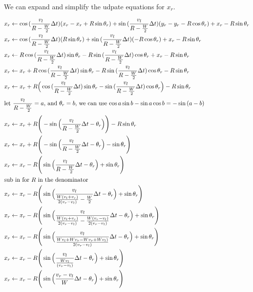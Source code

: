 \documentclass{article}
\begin{document}
We can expand and simplify the udpate equations for $x_r$.

\begin{align}
  x_r &\leftarrow \cos{(\dfrac{v_l}{R-\frac{W}{2}}\Delta t)}(x_r-x_r+R\sin{\theta_r})+\sin{(\dfrac{v_l}{R-\frac{W}{2}}\Delta t)}(y_r-y_r-R\cos{\theta_r}) + x_r-R\sin{\theta_r} \\
  x_r &\leftarrow \cos{(\dfrac{v_l}{R-\frac{W}{2}}\Delta t)}(R\sin{\theta_r})+\sin{(\dfrac{v_l}{R-\frac{W}{2}}\Delta t)}(-R\cos{\theta_r}) + x_r-R\sin{\theta_r} \\
  x_r &\leftarrow R\cos{(\dfrac{v_l}{R-\frac{W}{2}}\Delta t)}\sin{\theta_r}-R\sin{(\dfrac{v_l}{R-\frac{W}{2}}\Delta t)}\cos{\theta_r} + x_r-R\sin{\theta_r} \\
  x_r &\leftarrow x_r+R\cos{(\dfrac{v_l}{R-\frac{W}{2}}\Delta t)}\sin{\theta_r}-R\sin{(\dfrac{v_l}{R-\frac{W}{2}}\Delta t)}\cos{\theta_r}-R\sin{\theta_r} \\
  x_r &\leftarrow x_r+R\Big(\cos{(\dfrac{v_l}{R-\frac{W}{2}}\Delta t)}\sin{\theta_r}-\sin{(\dfrac{v_l}{R-\frac{W}{2}}\Delta t)}\cos{\theta_r}\Big)-R\sin{\theta_r} \\
  \shortintertext{let $\dfrac{v_l}{R-\frac{W}{2}}=a$, and $\theta_r=b$, we can use $\cos{a}\sin{b}-\sin{a}\cos{b}=-\sin{(a-b)}$}
  x_r &\leftarrow x_r+R\Bigg(-\sin{\Big(\dfrac{v_l}{R-\frac{W}{2}}\Delta t-\theta_r}\Big)\Bigg)-R\sin{\theta_r} \\
  x_r &\leftarrow x_r+R\Bigg(-\sin{\Big(\dfrac{v_l}{R-\frac{W}{2}}\Delta t-\theta_r}\Big)-\sin{\theta_r}\Bigg) \\
  x_r &\leftarrow x_r-R\Bigg(\sin{\Big(\dfrac{v_l}{R-\frac{W}{2}}\Delta t-\theta_r}\Big)+\sin{\theta_r}\Bigg) \\
  \shortintertext{sub in for $R$ in the denominator}
  x_r &\leftarrow x_r-R\Bigg(\sin{\Big(\dfrac{v_l}{\frac{W(v_l+v_r)}{2(v_r-v_l)}-\frac{W}{2}}\Delta t-\theta_r}\Big)+\sin{\theta_r}\Bigg) \\
  x_r &\leftarrow x_r-R\Bigg(\sin{\Big(\dfrac{v_l}{\frac{W(v_l+v_r)}{2(v_r-v_l)}-\frac{W(v_r-v_l)}{2(v_r-v_l)}}\Delta t-\theta_r\Big)}+\sin{\theta_r}\Bigg) \\
  x_r &\leftarrow x_r-R\Bigg(\sin{\Big(\dfrac{v_l}{\frac{Wv_l+Wv_r-Wv_r+Wv_l)}{2(v_r-v_l)}}\Delta t-\theta_r\Big)}+\sin{\theta_r}\Bigg) \\
  x_r &\leftarrow x_r-R\Bigg(\sin{\Big(\dfrac{v_l}{\frac{Wv_l}{(v_r-v_l)}}\Delta t-\theta_r\Big)}+\sin{\theta_r}\Bigg) \\
  x_r &\leftarrow x_r-R\Bigg(\sin{\Big(\frac{v_r-v_l}{W}\Delta t-\theta_r\Big)}+\sin{\theta_r}\Bigg)
\end{align}
\end{document}

